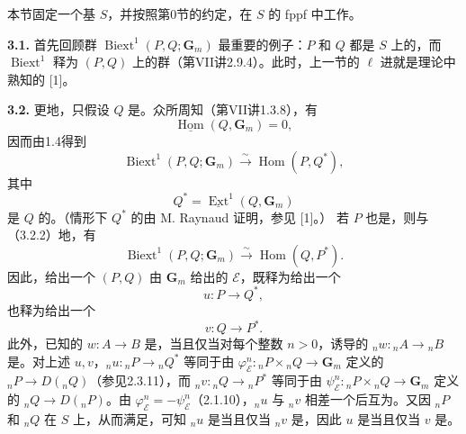 本节固定一个基 $S$，并按照第0节的约定，在 $S$ 的 fppf 中工作。

\textbf{3.1.} 首先回顾群 $\operatorname{Biext}^1(P,Q;\mathbf G_m)$ 最重要的例子：$P$ 和 $Q$ 都是 $S$ 上的，而 $\operatorname{Biext}^1$ 释为 $(P,Q)$ 上的群（第VII讲2.9.4）。此时，上一节的 $\ell$ 进就是理论中熟知的 [1]。

\textbf{3.2.} 更地，只假设 $Q$ 是。众所周知（第VII讲1.3.8），有
\[
\underline{\operatorname{Hom}}(Q,\mathbf G_m)=0,\tag{3.2.1}
\]
因而由1.4得到
\[
\operatorname{Biext}^1(P,Q;\mathbf G_m)\xrightarrow{\sim}\operatorname{Hom}(P,Q^*),\tag{3.2.2}
\]
其中
\[
Q^*=\underline{\operatorname{Ext}}^1(Q,\mathbf G_m)\tag{3.2.3}
\]
是 $Q$ 的。（情形下 $Q^*$ 的由 M. Raynaud 证明，参见 [1]。）
若 $P$ 也是，则与（3.2.2）地，有
\[
\operatorname{Biext}^1(P,Q;\mathbf G_m)\xrightarrow{\sim}\operatorname{Hom}(Q,P^*).\tag{3.2.4}
\]
因此，给出一个 $(P,Q)$ 由 $\mathbf G_m$ 给出的 $\mathscr E$，既释为给出一个
\[u:P\longrightarrow Q^*,\]
也释为给出一个
\[v:Q\longrightarrow P^*.\]
此外，已知的 $w:A\to B$ 是，当且仅当对每个整数 $n>0$，诱导的 ${}_nw:{}_nA\to{}_nB$ 是。对上述 $u,v$，${}_nu:{}_nP\to{}_nQ^*$ 等同于由 $\varphi_{\mathscr E}^n:{}_nP\times{}_nQ\to\mathbf G_m$ 定义的 ${}_nP\to D({}_nQ)$（参见2.3.11），而 ${}_nv:{}_nQ\to{}_nP^*$ 等同于由 $\psi_{\mathscr E}^n:{}_nP\times{}_nQ\to\mathbf G_m$ 定义的 ${}_nQ\to D({}_nP)$。由 $\varphi_{\mathscr E}^n=-\psi_{\mathscr E}^n$（2.1.10），${}_nu$ 与 ${}_nv$ 相差一个后互为。又因 ${}_nP$ 和 ${}_nQ$ 在 $S$ 上，从而满足，可知 ${}_nu$ 是当且仅当 ${}_nv$ 是，因此 $u$ 是当且仅当 $v$ 是。

